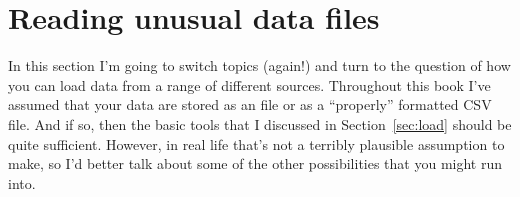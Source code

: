 \section{Reading unusual data files~\label{sec:importing}}

In this section I'm going to switch topics (again!) and turn to the question of how you can load data from a range of different sources. Throughout this book I've assumed that your data are stored as an  file or as a ``properly'' formatted CSV file. And if so, then the basic tools that I discussed in Section~\ref{sec:load} should be quite sufficient. However, in real life that's not a terribly plausible assumption to make, so I'd better talk about some of the other possibilities that you might run into. 



